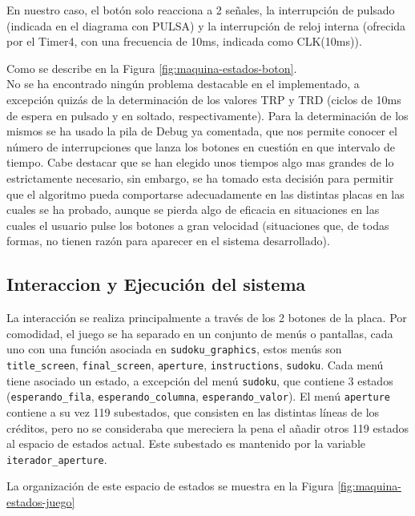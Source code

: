 \documentclass[12pt,letterpaper]{article}
\begin{document}
En nuestro caso, el botón solo reacciona a 2 señales, la interrupción
de pulsado (indicada en el diagrama con PULSA) y la interrupción de
reloj interna (ofrecida por el Timer4, con una frecuencia de 10ms,
indicada como CLK(10ms)).

Como se describe en la Figura \ref{fig:maquina-estados-boton}.\\
No se ha encontrado ningún problema destacable en el implementado, a
excepción quizás de la determinación de los valores TRP y TRD (ciclos
de 10ms de espera en pulsado y en soltado, respectivamente). Para la
determinación de los mismos se ha usado la pila de Debug ya comentada,
que nos permite conocer el número de interrupciones que lanza los
botones en cuestión en que intervalo de tiempo. Cabe destacar que se
han elegido unos tiempos algo mas grandes de lo estrictamente
necesario, sin embargo, se ha tomado esta decisión para permitir que
el algoritmo pueda comportarse adecuadamente en las distintas placas
en las cuales se ha probado, aunque se pierda algo de eficacia en
situaciones en las cuales el usuario pulse los botones a gran
velocidad (situaciones que, de todas formas, no tienen razón para
aparecer en el sistema desarrollado).

\subsection{Interaccion y Ejecución del sistema}
\label{subsec:interaction-ejecucion}
La interacción se realiza principalmente a través de los 2 botones de
la placa. Por comodidad, el juego se ha separado en un conjunto de
menús o pantallas, cada uno con una función asociada en
\texttt{sudoku\_graphics}, estos menús son \texttt{title\_screen},
\texttt{final\_screen}, \texttt{aperture}, \texttt{instructions},
\texttt{sudoku}. Cada menú tiene asociado un estado, a excepción del
menú \texttt{sudoku}, que contiene 3 estados
(\texttt{esperando\_fila}, \texttt{esperando\_columna},
\texttt{esperando\_valor}). El menú \texttt{aperture} contiene a su
vez 119 subestados, que consisten en las distintas líneas de los
créditos, pero no se consideraba que mereciera la pena el añadir otros
119 estados al espacio de estados actual. Este subestado es mantenido
por la variable \texttt{iterador\_aperture}.

La organización de este espacio de estados se muestra en la Figura
\ref{fig:maquina-estados-juego}
\end{document}

